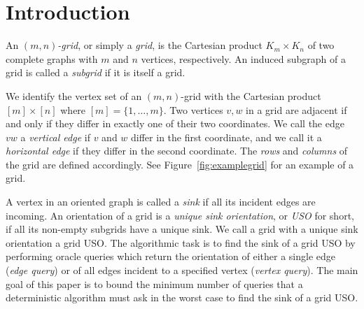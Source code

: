 \documentclass[runningheads,a4paper]{llncs}
\begin{document}
\section{Introduction}
An \emph{$(m,n)$-grid}, or simply a \emph{grid}, is the Cartesian product $K_m \times K_n$ of two complete graphs with $m$ and $n$ vertices, respectively. 
An induced subgraph of a grid is called a \emph{subgrid} if it is itself a grid.

We identify the vertex set of an $(m,n)$-grid with the Cartesian product $[m] \times [n]$ where $[m] = \{1,\ldots,m\}$. Two
vertices $v,w$ in a grid are adjacent if and only if they differ in
exactly one of their two coordinates.
We call the edge $vw$ a \emph{vertical edge} if $v$ and $w$ differ in the
first coordinate, and we call it a \emph{horizontal edge} if they differ in the
second coordinate. The \emph{rows} and \emph{columns} of the grid are defined accordingly.
See Figure~\ref{fig:examplegrid} for an example of a grid.

A vertex in an oriented graph is called a \emph{sink} if all its incident edges are incoming.
An orientation of a grid is a \emph{unique sink orientation}, or \emph{USO}
for short, if all its non-empty subgrids have a unique sink. We call a grid with a unique sink orientation a grid USO.
The algorithmic task is to find the sink of a grid USO by performing oracle queries which return the orientation of either a single edge (\emph{edge query}) or of all edges incident to a specified vertex (\emph{vertex query}). 
The main goal of this paper is to bound the minimum number of queries that a deterministic algorithm must ask in the worst case to find the sink of a grid USO. 
\end{document}
